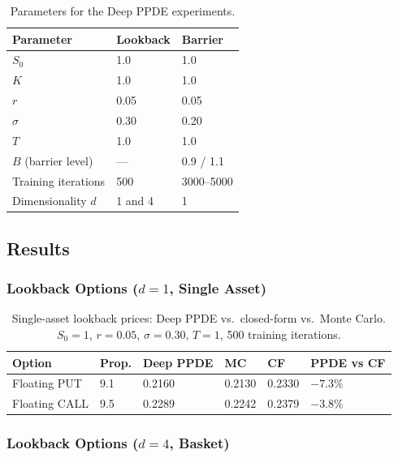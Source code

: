 \documentclass[12pt,a4paper]{article}
\begin{document}
\begin{table}[H]
\centering
\caption{Parameters for the Deep PPDE experiments.}
\label{tab:params_b}
\begin{tabular}{L{4.5cm} C{3cm} C{3cm}}
\toprule
\textbf{Parameter} & \textbf{Lookback} & \textbf{Barrier} \\
\midrule
$S_0$                        & 1.0       & 1.0 \\
$K$                          & 1.0       & 1.0 \\
$r$                          & 0.05      & 0.05 \\
$\sigma$                     & 0.30      & 0.20 \\
$T$                          & 1.0       & 1.0 \\
$B$ (barrier level)          & ---       & 0.9 / 1.1 \\
Training iterations          & 500       & 3000--5000 \\
Dimensionality $d$           & 1 and 4   & 1 \\
\bottomrule
\end{tabular}
\end{table}

\subsection{Results}

\subsubsection{Lookback Options ($d = 1$, Single Asset)}

\begin{table}[H]
\centering
\caption{Single-asset lookback prices: Deep PPDE vs.\ closed-form vs.\ Monte Carlo.
  $S_0=1$, $r=0.05$, $\sigma=0.30$, $T=1$, 500 training iterations.}
\label{tab:ppde_lookback_1d}
\begin{tabular}{L{4cm} C{1.8cm} C{1.8cm} C{1.8cm} C{2cm} C{2cm}}
\toprule
\textbf{Option} & \textbf{Prop.} & \textbf{Deep PPDE} & \textbf{MC} & \textbf{CF} & \textbf{PPDE vs CF} \\
\midrule
Floating PUT  & 9.1 & 0.2160 & 0.2130 & 0.2330 & $-7.3\%$ \\
Floating CALL & 9.5 & 0.2289 & 0.2242 & 0.2379 & $-3.8\%$ \\
\bottomrule
\end{tabular}
\end{table}

\subsubsection{Lookback Options ($d = 4$, Basket)}
\end{document}
